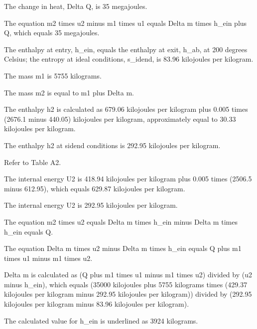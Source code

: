 The change in heat, Delta Q, is 35 megajoules.

The equation m2 times u2 minus m1 times u1 equals Delta m times h_ein plus Q, which equals 35 megajoules.

The enthalpy at entry, h_ein, equals the enthalpy at exit, h_ab, at 200 degrees Celsius; the entropy at ideal conditions, s_idend, is 83.96 kilojoules per kilogram.

The mass m1 is 5755 kilograms.

The mass m2 is equal to m1 plus Delta m.

The enthalpy h2 is calculated as 679.06 kilojoules per kilogram plus 0.005 times (2676.1 minus 440.05) kilojoules per kilogram, approximately equal to 30.33 kilojoules per kilogram.

The enthalpy h2 at sidend conditions is 292.95 kilojoules per kilogram.

Refer to Table A2.

The internal energy U2 is 418.94 kilojoules per kilogram plus 0.005 times (2506.5 minus 612.95), which equals 629.87 kilojoules per kilogram.

The internal energy U2 is 292.95 kilojoules per kilogram.

The equation m2 times u2 equals Delta m times h_ein minus Delta m times h_ein equals Q.

The equation Delta m times u2 minus Delta m times h_ein equals Q plus m1 times u1 minus m1 times u2.

Delta m is calculated as (Q plus m1 times u1 minus m1 times u2) divided by (u2 minus h_ein), which equals (35000 kilojoules plus 5755 kilograms times (429.37 kilojoules per kilogram minus 292.95 kilojoules per kilogram)) divided by (292.95 kilojoules per kilogram minus 83.96 kilojoules per kilogram).

The calculated value for h_ein is underlined as 3924 kilograms.